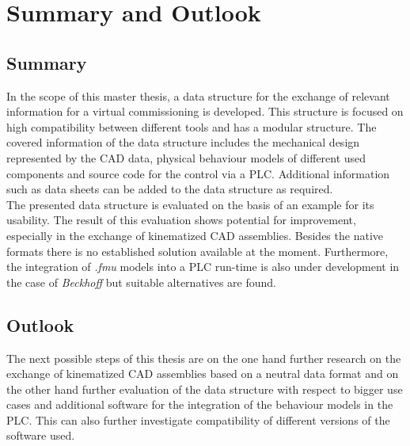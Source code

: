 \chapter{Summary and Outlook}   \label{sec:SummaryAndOutlook}

\section{Summary}
    In the scope of this master thesis, a data structure for the exchange of relevant information for a virtual commissioning is developed. This structure is focused on high compatibility between different tools and has a modular structure. The covered information of the data structure includes the mechanical design represented by the CAD data, physical behaviour models of different used components and source code for the control via a PLC. Additional information such as data sheets can be added to the data structure as required. \\
    
    The presented data structure is evaluated on the basis of an example for its usability. The result of this evaluation shows potential for improvement, especially in the exchange of kinematized CAD assemblies. Besides the native formats there is no established solution available at the moment. Furthermore, the integration of \textit{.fmu} models into a PLC run-time is also under development in the case of \textit{Beckhoff} but suitable alternatives are found. 
    

\section{Outlook}
    The next possible steps of this thesis are on the one hand further research on the exchange of kinematized CAD assemblies based on a neutral data format and on the other hand further evaluation of the data structure with respect to bigger use cases and additional software for the integration of the behaviour models in the PLC. This can also further investigate compatibility of different versions of the software used. 



    
